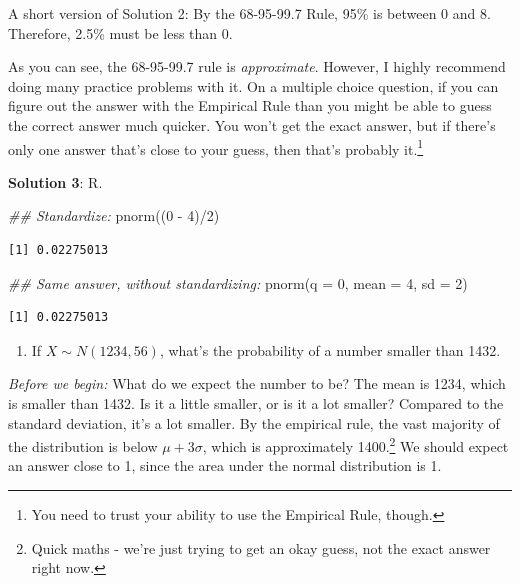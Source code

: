 \documentclass[
  letterpaper,
  DIV=11,
  numbers=noendperiod,
  oneside]{scrreprt}
\newenvironment{Shaded}{\begin{snugshade}}{\end{snugshade}}
\newcommand{\AttributeTok}[1]{\textcolor[rgb]{0.40,0.45,0.13}{#1}}
\newcommand{\DecValTok}[1]{\textcolor[rgb]{0.68,0.00,0.00}{#1}}
\newcommand{\DocumentationTok}[1]{\textcolor[rgb]{0.37,0.37,0.37}{\textit{#1}}}
\newcommand{\FunctionTok}[1]{\textcolor[rgb]{0.28,0.35,0.67}{#1}}
\newcommand{\NormalTok}[1]{\textcolor[rgb]{0.00,0.23,0.31}{#1}}
\newcommand{\SpecialCharTok}[1]{\textcolor[rgb]{0.37,0.37,0.37}{#1}}
\providecommand{\tightlist}{%
  \setlength{\itemsep}{0pt}\setlength{\parskip}{0pt}}\usepackage{longtable,booktabs,array}
\begin{document}
A short version of Solution 2: By the 68-95-99.7 Rule, 95\% is between 0
and 8. Therefore, 2.5\% must be less than 0.

As you can see, the 68-95-99.7 rule is \emph{approximate}. However, I
highly recommend doing many practice problems with it. On a multiple
choice question, if you can figure out the answer with the Empirical
Rule than you might be able to guess the correct answer much quicker.
You won't get the exact answer, but if there's only one answer that's
close to your guess, then that's probably it.\footnote{You need to trust
  your ability to use the Empirical Rule, though.}

\textbf{Solution 3}: R.

\begin{Shaded}
\begin{Highlighting}[]
\DocumentationTok{\#\# Standardize:}
\FunctionTok{pnorm}\NormalTok{((}\DecValTok{0} \SpecialCharTok{{-}} \DecValTok{4}\NormalTok{)}\SpecialCharTok{/}\DecValTok{2}\NormalTok{)}
\end{Highlighting}
\end{Shaded}

\begin{verbatim}
[1] 0.02275013
\end{verbatim}

\begin{Shaded}
\begin{Highlighting}[]
\DocumentationTok{\#\# Same answer, without standardizing:}
\FunctionTok{pnorm}\NormalTok{(}\AttributeTok{q =} \DecValTok{0}\NormalTok{, }\AttributeTok{mean =} \DecValTok{4}\NormalTok{, }\AttributeTok{sd =} \DecValTok{2}\NormalTok{)}
\end{Highlighting}
\end{Shaded}

\begin{verbatim}
[1] 0.02275013
\end{verbatim}

\begin{enumerate}
\def\labelenumi{\arabic{enumi}.}
\setcounter{enumi}{1}
\tightlist
\item
  If \(X\sim N(1234, 56)\), what's the probability of a number smaller
  than 1432.
\end{enumerate}

\emph{Before we begin:} What do we expect the number to be? The mean is
1234, which is smaller than 1432. Is it a little smaller, or is it a lot
smaller? Compared to the standard deviation, it's a lot smaller. By the
empirical rule, the vast majority of the distribution is below
\(\mu + 3\sigma\), which is approximately 1400.\footnote{Quick maths -
  we're just trying to get an okay guess, not the exact answer right
  now.} We should expect an answer close to 1, since the area under the
normal distribution is 1.
\end{document}

